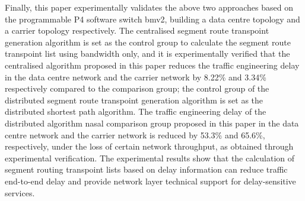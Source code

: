 {Finally, this paper experimentally validates the above two approaches based on the programmable P4 software switch bmv2, building a data centre topology and a carrier topology respectively. The centralised segment route transpoint generation algorithm is set as the control group to calculate the segment route transpoint list using bandwidth only, and it is experimentally verified that the centralised algorithm proposed in this paper reduces the traffic engineering delay in the data centre network and the carrier network by 8.22\% and 3.34\% respectively compared to the comparison group; the control group of the distributed segment route transpoint generation algorithm is set as the distributed shortest path algorithm. The traffic engineering delay of the distributed algorithm nasal comparison group proposed in this paper in the data centre network and the carrier network is reduced by 53.3\% and 65.6\%, respectively, under the loss of certain network throughput, as obtained through experimental verification. The experimental results show that the calculation of segment routing transpoint lists based on delay information can reduce traffic end-to-end delay and provide network layer technical support for delay-sensitive services.
}

